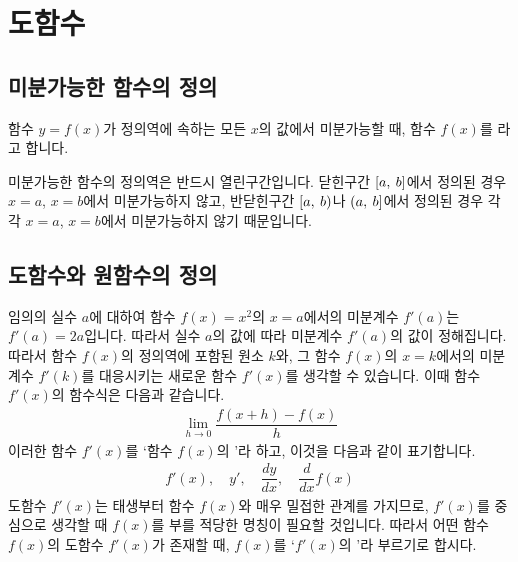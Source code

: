 \section{도함수}
\subsection{미분가능한 함수의 정의}
함수 $y=f\left( x \right) $가 정의역에 속하는 모든 $x$의 값에서 미분가능할 때, 함수 $f\left( x \right) $를 라고 합니다.

미분가능한 함수의 정의역은 반드시 열린구간입니다. 닫힌구간 $\left[a,\: b\right]$에서 정의된 경우 $x=a$, $x=b$에서 미분가능하지 않고, 반닫힌구간 $\left[a,\: b\right)$나 $\left(a,\: b\right]$에서 정의된 경우 각각 $x=a$, $x=b$에서 미분가능하지 않기 때문입니다.

\subsection{도함수와 원함수의 정의}
임의의 실수 $a$에 대하여 함수 $f\left( x \right) = x^2$의 $x=a$에서의 미분계수 $f'\left( a \right) $는 $f'\left( a \right) = 2a $입니다. 따라서 실수 $a$의 값에 따라 미분계수 $f'\left( a \right) $의 값이  정해집니다. 따라서 함수 $f\left( x \right) $의 정의역에 포함된 원소 $k$와, 그 함수 $f\left( x \right) $의 $x=k$에서의 미분계수 $f'\left( k \right) $를 대응시키는 새로운 함수 $f'\left( x \right) $를 생각할 수 있습니다. 이때 함수 $f'\left( x \right) $의 함수식은 다음과 같습니다.
\begin{align*} \lim_{h \to 0}\dfrac{f\left( x+h \right)  - f\left( x \right) }{ h}\end{align*}
이러한 함수 $f'\left( x \right) $를 `함수 $f\left( x \right) $의 '라 하고, 이것을 다음과 같이 표기합니다.
\begin{align*}f'\left( x \right),\quad y',\quad \dfrac{dy}{dx} ,\quad \dfrac{d}{dx}f\left( x \right)\end{align*}
도함수 $f'\left( x \right) $는 태생부터 함수 $f\left( x \right) $와 매우 밀접한 관계를 가지므로, $f'\left( x \right) $를 중심으로 생각할 때 $f(x)$를 부를 적당한 명칭이 필요할 것입니다. 따라서 어떤 함수 $f(x)$의 도함수 $f'(x)$가 존재할 때, $f\left( x \right) $를 `$f'\left( x \right) $의 '라 부르기로 합시다.
\clearpage
